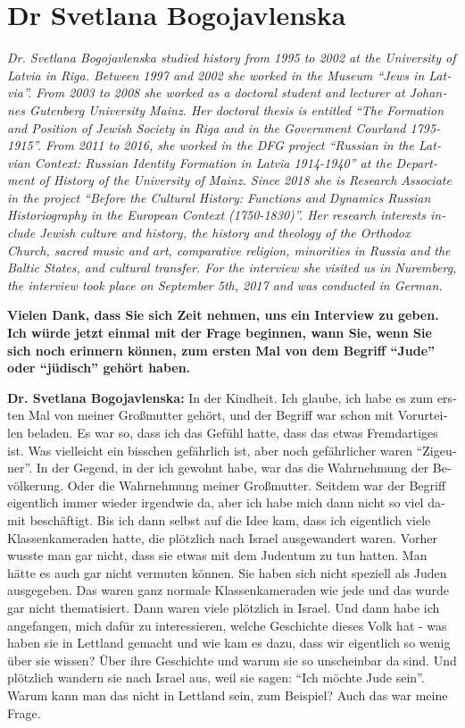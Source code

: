 \section{Dr Svetlana Bogojavlenska}
\begin{otherlanguage}{ngerman}
\textit{Dr. Svetlana Bogojavlenska studied history from 1995 to 2002 at the University of Latvia in Riga. Between 1997 and 2002 she worked in the Museum ``Jews in Latvia''. From 2003 to 2008 she worked as a doctoral student and lecturer at Johannes Gutenberg University Mainz. Her doctoral thesis is entitled ``The Formation and Position of Jewish Society in Riga and in the Government Courland 1795-1915''. From 2011 to 2016, she worked in the DFG project ``Russian in the Latvian Context: Russian Identity Formation in Latvia 1914-1940'' at the Department of History of the University of Mainz. Since 2018 she is Research Associate in the project ``Before the Cultural History: Functions and Dynamics Russian Historiography in the European Context (1750-1830)''. Her research interests include Jewish culture and history, the history and theology of the Orthodox Church, sacred music and art, comparative religion, minorities in Russia and the Baltic States, and cultural transfer.
For the interview she visited us in Nuremberg, the interview took place on September 5th, 2017 and was conducted in German.}\par
\vspace*{2em}
\textbf{Vielen Dank, dass Sie sich Zeit nehmen, uns ein Interview zu geben. Ich würde jetzt einmal mit der Frage beginnen, wann Sie, wenn Sie sich noch erinnern können, zum ersten Mal von dem Begriff "`Jude"' oder "`jüdisch"' gehört haben.}

\textbf{Dr. Svetlana Bogojavlenska:} In der Kindheit. Ich glaube, ich habe es zum ersten Mal von meiner Großmutter gehört, und der Begriff war schon mit Vorurteilen beladen. Es war so, dass ich das Gefühl hatte, dass das etwas Fremdartiges ist. Was vielleicht ein bisschen gefährlich ist, aber noch gefährlicher waren "`Zigeuner"'. In der Gegend, in der ich gewohnt habe, war das die Wahrnehmung der Bevölkerung. Oder die Wahrnehmung meiner Großmutter. Seitdem war der Begriff eigentlich immer wieder irgendwie da, aber ich habe mich dann nicht so viel damit beschäftigt. Bis ich dann selbst auf die Idee kam, dass ich eigentlich viele Klassenkameraden hatte, die plötzlich nach Israel ausgewandert waren.
Vorher wusste man gar nicht, dass sie etwas mit dem Judentum zu tun hatten. Man hätte es auch gar nicht vermuten können. Sie haben sich nicht speziell als Juden ausgegeben. Das waren ganz normale Klassenkameraden wie jede und das wurde gar nicht thematisiert. Dann waren viele plötzlich in Israel. Und dann habe ich angefangen, mich dafür zu interessieren, welche Geschichte dieses Volk hat - was haben sie in Lettland gemacht und wie kam es dazu, dass wir eigentlich so wenig über sie wissen? Über ihre Geschichte und warum sie so unscheinbar da sind. Und plötzlich wandern sie nach Israel aus, weil sie sagen: "`Ich möchte Jude sein"'. Warum kann man das nicht in Lettland sein, zum Beispiel? Auch das war meine Frage.


\end{otherlanguage}

